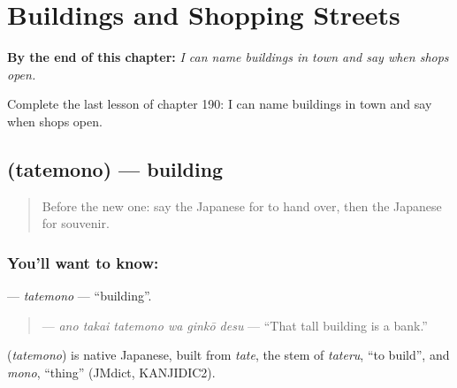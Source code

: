 
\chapter{Buildings and Shopping Streets}
\label{ch:ja-buildings-and-shopping-streets}

\begin{chapteropening}
\textbf{By the end of this chapter:} \emph{I can name buildings in town and say when shops open.}

Complete the last lesson of chapter 190: I can name buildings in town and say when shops open.
\end{chapteropening}

\section[\texorpdfstring{\ja{たてもの} (tatemono)}{たてもの (tatemono)}]{ (tatemono) — building}

\label{lesson:JA-C190-tatemono}



\begin{quote}
Before the new one: say the Japanese for to hand over, then the Japanese for souvenir.
\end{quote}

\subsection*{You'll want to know: }
\textbf{} — \emph{tatemono} — \textquotedblleft{}building\textquotedblright{}.

\begin{quote}
\textbf{   } — \emph{ano takai tatemono wa ginkō desu} — \textquotedblleft{}That tall building is a bank.\textquotedblright{}
\end{quote}

\begin{cousinweb}
\textbf{} (\emph{tatemono}) is native Japanese, built from \emph{tate}, the stem of \emph{tateru}, \textquotedblleft{}to build\textquotedblright{}, and \emph{mono}, \textquotedblleft{}thing\textquotedblright{} (JMdict, KANJIDIC2).
\end{cousinweb}

